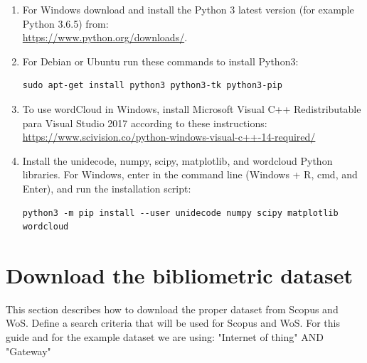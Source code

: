 \documentclass[10pt,letterpaper]{article}
\begin{document}
\begin{enumerate}
\item For Windows download and install the Python 3 latest version (for example Python 3.6.5) from: \\ \url{https://www.python.org/downloads/}.
\item For Debian or Ubuntu run these commands to install Python3: 
\begin{verbatim}
sudo apt-get install python3 python3-tk python3-pip
\end{verbatim}

\item To use wordCloud in Windows, install Microsoft Visual C++ Redistributable para Visual Studio 2017 according to these instructions: \url{https://www.scivision.co/python-windows-visual-c++-14-required/}

\item Install the unidecode, numpy, scipy, matplotlib, and wordcloud Python libraries. For Windows, enter in the command line (Windows + R, cmd, and Enter), and run the installation script:
\begin{verbatim}
python3 -m pip install --user unidecode numpy scipy matplotlib wordcloud
\end{verbatim}

\end{enumerate}

\section{Download the bibliometric dataset}
This section describes how to download the proper dataset from Scopus and WoS. Define a search criteria that will be used for Scopus and WoS. For this guide and for the example dataset we are using: "Internet of thing"  AND  "Gateway" 
\end{document}
